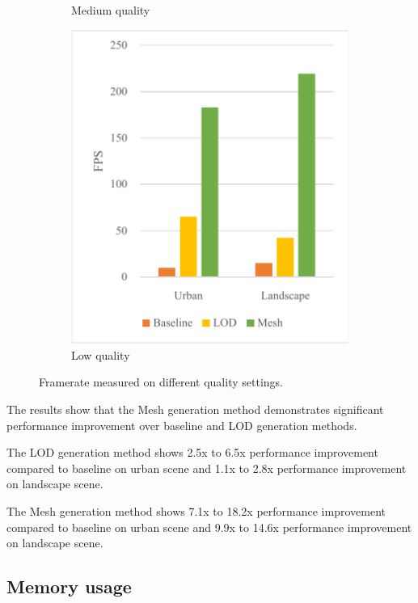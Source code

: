 \begin{figure}[h]
\begin{subfigure}{0.3\textwidth}
        \caption{Medium quality}
    \end{subfigure}
    \begin{subfigure}{0.3\textwidth}
        \centering
        \includegraphics[width=\textwidth]{graph-fps-low.pdf}
        \caption{Low quality}
    \end{subfigure}
    
    \caption{Framerate measured on different quality settings.}
    \label{fig:results:graph-fps}
\end{figure}

The results show that the Mesh generation method demonstrates significant performance improvement over baseline and LOD generation methods.

The LOD generation method shows 2.5x to 6.5x performance improvement compared to baseline on urban scene and 1.1x to 2.8x performance improvement on landscape scene.

The Mesh generation method shows 7.1x to 18.2x performance improvement compared to baseline on urban scene and 9.9x to 14.6x performance improvement on landscape scene.

\subsection{Memory usage}

